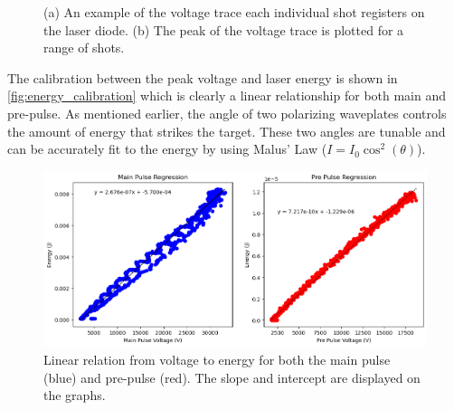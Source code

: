 \begin{figure}
	\centering 
	\caption{(a) An example of the voltage trace each individual shot registers on the laser diode. (b) The peak of the voltage trace is plotted for a range of shots.}
\end{figure}

The calibration between the peak voltage and laser energy is shown in \autoref{fig:energy_calibration} which is clearly a linear relationship for both main and pre-pulse. As mentioned earlier, the angle of two polarizing waveplates controls the amount of energy that strikes the target. These two angles are tunable and can be accurately fit to the energy by using Malus' Law ($I = I_0 \cos^2(\theta)$).

\begin{figure}
	\centering 
	\includegraphics[width=0.9\linewidth]{planning/images/daq/energy_calibration.png}
	\caption{Linear relation from voltage to energy for both the main pulse (blue) and pre-pulse (red). The slope and intercept are displayed on the graphs.}
	\label{fig:energy_calibration}
\end{figure}


